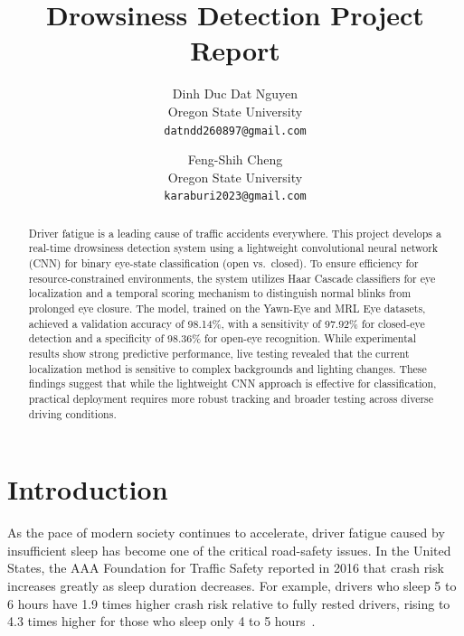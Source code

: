\documentclass[10pt,twocolumn,letterpaper]{article}
\begin{document}
\title{Drowsiness Detection Project Report}

\author{Dinh Duc Dat Nguyen \\
Oregon State University \\
{\tt\small datndd260897@gmail.com}
\and
Feng-Shih Cheng \\
Oregon State University \\
{\tt\small karaburi2023@gmail.com}
}

\maketitle

\begin{abstract}
Driver fatigue is a leading cause of traffic accidents everywhere. This project develops a real-time drowsiness detection system using a lightweight convolutional neural network (CNN) for binary eye-state classification (open vs.\ closed). To ensure efficiency for resource-constrained environments, the system utilizes Haar Cascade classifiers for eye localization and a temporal scoring mechanism to distinguish normal blinks from prolonged eye closure. 
The model, trained on the Yawn-Eye and MRL Eye datasets, achieved a validation accuracy of 98.14\%, with a sensitivity of 97.92\% for closed-eye detection and a specificity of 98.36\% for open-eye recognition. 
While experimental results show strong predictive performance, live testing revealed that the current localization method is sensitive to complex backgrounds and lighting changes. These findings suggest that while the lightweight CNN approach is effective for classification, practical deployment requires more robust tracking and broader testing across diverse driving conditions.
\end{abstract}

\section{Introduction}

As the pace of modern society continues to accelerate, driver fatigue caused by insufficient sleep has become one of the critical road-safety issues. 
In the United States, the AAA Foundation for Traffic Safety reported in 2016 that crash risk increases greatly as sleep duration decreases. For example, drivers who sleep 5 to 6 hours have 1.9 times higher crash risk relative to fully rested drivers, 
rising to 4.3 times higher for those who sleep only 4 to 5 hours~\cite{Tefft2016}.
\end{document}

